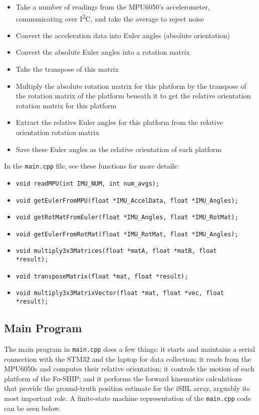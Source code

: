 \documentclass[12pt,a4paper]{report}
\begin{document}
\begin{itemize}[noitemsep,topsep=0pt]
	\item Take a number of readings from the MPU6050’s accelerometer, communicating over I\textsuperscript{2}C, and take the average to reject noise
	\item Convert the acceleration data into Euler angles (absolute orientation)
	\item Convert the absolute Euler angles into a rotation matrix
	\item Take the transpose of this matrix
	\item Multiply the absolute rotation matrix for this platform by the transpose of the rotation matrix of the platform beneath it to get the relative orientation rotation matrix for this platform
	\item Extract the relative Euler angles for this platform from the relative orientation rotation matrix
	\item Save these Euler angles as the relative orientation of each platform
\end{itemize}

\noindent In the \verb|main.cpp| file, see these functions for more details:

\begin{itemize}[noitemsep,topsep=0pt]
	\item \verb|void readMPU(int IMU_NUM, int num_avgs);|
	\item \verb|void getEulerFromMPU(float *IMU_AccelData, float *IMU_Angles);|
	\item \verb|void getRotMatFromEuler(float *IMU_Angles, float *IMU_RotMat);|
	\item \verb|void getEulerFromRotMat(float *IMU_RotMat, float *IMU_Angles);|
	\item \verb|void multiply3x3Matrices(float *matA, float *matB, float|\\ \verb|*result);|
	\item \verb|void transposeMatrix(float *mat, float *result);|
	\item \verb|void multiply3x3MatrixVector(float *mat, float *vec, float|\\ \verb|*result);|
\end{itemize}

\subsection{Main Program} \label{ssec:2s5s3}
The main program in \verb|main.cpp| does a few things: it starts and maintains a serial connection with the STM32 and the laptop for data collection; it reads from the MPU6050s and computes their relative orientation; it controls the motion of each platform of the Fo-SHIP; and it performs the forward kinematics calculations that provide the ground-truth position estimate for the iSBL array, arguably its most important role. A finite-state machine representation of the \verb|main.cpp| code can be seen below.
\end{document}
